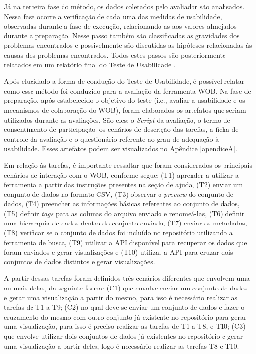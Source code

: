 Já na terceira fase do método, os dados coletados pelo avaliador são analisados. Nessa fase 
ocorre a verificação de cada uma das medidas de usabilidade, observadas durante a fase de 
execução, relacionando-as aos valores almejados durante a preparação. Nesse passo também 
são classificadas as gravidades dos problemas encontrados e possivelmente são discutidas as 
hipóteses relacionadas às causas dos problemas encontrados. Todos estes passos são 
posteriormente relatados em um relatório final do Teste de Usabilidade \cite{barbosa2010}.

Após elucidado a forma de condução do Teste de Usabilidade, é possível relatar como esse 
método foi conduzido para a avaliação da ferramenta WOB. Na fase de preparação, após 
estabelecido o objetivo do teste (i.e., avaliar a usabilidade e os mecanismos de 
colaboração do WOB), foram elaborados os artefatos que seriam utilizados durante as 
avaliações. São eles: o \textit{Script} da avaliação, o termo de consentimento de participação, 
os cenários de descrição das tarefas, a ficha de controle da avaliação e o questionário
referente ao grau de adequação à usabilidade. Esses artefatos podem ser visualizados no 
Apêndice \ref{apendiceA}.

Em relação às tarefas, é importante ressaltar que foram considerados os principais cenários 
de interação com o WOB, conforme segue: (T1) aprender a utilizar a ferramenta a partir das 
instruções presentes na seção de ajuda, (T2) enviar um conjunto de dados no formato CSV, (T3) 
observar o \textit{preview} do conjunto de dados, (T4) preencher as informações básicas referentes ao 
conjunto de dados, (T5) definir \textit{tags} para as colunas do arquivo enviado e 
renomeá-las, (T6) definir uma hierarquia de dados dentro do conjunto enviado, (T7) enviar os 
metadados, (T8) verificar se o conjunto de dados foi incluído no repositório utilizando a 
ferramenta de busca, (T9) utilizar a API disponível para recuperar os dados que foram 
enviados e gerar visualizações e (T10) utilizar a API para cruzar dois conjuntos de 
dados distintos e gerar visualizações. 

A partir dessas tarefas foram definidos três cenários diferentes que envolvem uma ou mais 
delas, da seguinte forma: (C1) que envolve enviar um conjunto de dados e gerar uma 
visualização a partir do mesmo, para isso é necessário realizar as tarefas de T1 a T9; 
(C2) no qual deve-se enviar um conjunto de dados e fazer o cruzamento do mesmo com outro 
conjunto já existente no repositório para gerar uma visualização, para isso é 
preciso realizar as tarefas de T1 a T8, e T10; (C3) que envolve utilizar dois conjuntos de 
dados já existentes no repositório e gerar uma visualização a partir deles, logo é 
necessário realizar as tarefas T8 e T10.


